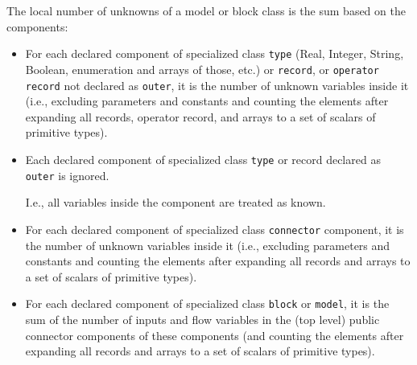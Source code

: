 \begin{definition}
The local number of unknowns of a model or block class is the sum based on the components:
\begin{itemize}
\item
  For each declared component of specialized class \lstinline!type! (Real, Integer,
  String, Boolean, enumeration and arrays of those, etc.) or \lstinline!record!, or
  \lstinline!operator record! not declared as \lstinline!outer!, it is the number of unknown
  variables inside it (i.e., excluding parameters and constants and
  counting the elements after expanding all records, operator record,
  and arrays to a set of scalars of primitive types).
\item
  Each declared component of specialized class \lstinline!type! or record declared
  as \lstinline!outer! is ignored.
  \begin{nonnormative}
  I.e., all variables inside the component are treated as known.
  \end{nonnormative}
\item
  For each declared component of specialized class \lstinline!connector! component,
  it is the number of unknown variables inside it (i.e., excluding
  parameters and constants and counting the elements after expanding all
  records and arrays to a set of scalars of primitive types).
\item
  For each declared component of specialized class \lstinline!block! or \lstinline!model!, it is
  the sum of the number of inputs and flow variables in the (top
  level) public connector components of these components (and counting
  the elements after expanding all records and arrays to a set of
  scalars of primitive types).
\end{itemize}
\end{definition}

